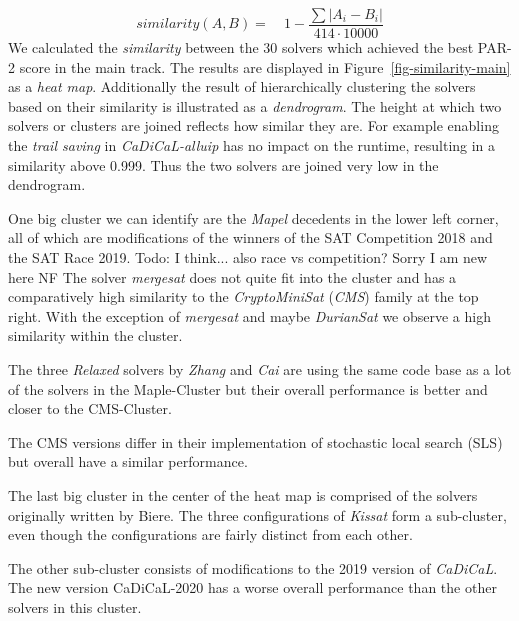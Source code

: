 \documentclass{elsarticle}
\newcommand{\todo}[1]{{\color{purple}Todo: #1}}
\begin{document}
\begin{equation}
\label{eq-similarity}
	similarity(A, B) =\quad 1 - \frac{\sum{|A_{i} - B_{i}|}}{414 \cdot 10000}
\end{equation}
We calculated the \emph{similarity} between the $30$ solvers which achieved the
best PAR-2 score in the main track. The results are displayed in
Figure~\ref{fig-similarity-main} as a \emph{heat map}. Additionally the result
of hierarchically clustering the solvers based on their similarity is
illustrated as a \emph{dendrogram}. The height at which two solvers or clusters
are joined reflects how similar they are. For example
enabling the \emph{trail saving} in \emph{CaDiCaL-alluip} has no impact on the
runtime, resulting in a similarity above \num{0.999}. Thus the two solvers are joined very low in the dendrogram.

One big cluster we can identify are the \emph{Mapel} decedents in the lower left
corner, all of which are modifications of the winners of the SAT Competition
2018 and the SAT Race 2019. \todo{I think... also race vs competition? Sorry I am new
  here NF} The solver \emph{mergesat} does not quite fit into the cluster and
has a comparatively high similarity to the \emph{CryptoMiniSat} (\emph{CMS})
family at the top right. With the exception of \emph{mergesat} and maybe
\emph{DurianSat} we observe a high similarity within the cluster.

The three \emph{Relaxed} solvers by \emph{Zhang} and \emph{Cai} are using the
same code base as a lot of the solvers in the Maple-Cluster but their overall
performance is better and closer to the CMS-Cluster.

The CMS versions differ in their implementation of stochastic local search (SLS)
but overall have a similar performance.

The last big cluster in the center of the heat map is comprised of the solvers
originally written by Biere. The three configurations of \emph{Kissat} form a
sub-cluster, even though the configurations are fairly distinct from each other.

The other sub-cluster consists of
modifications to the 2019 version of \emph{\mbox{CaDiCaL}}. The new version
CaDiCaL-2020 has a worse overall performance than
the other solvers in this cluster.
\end{document}
